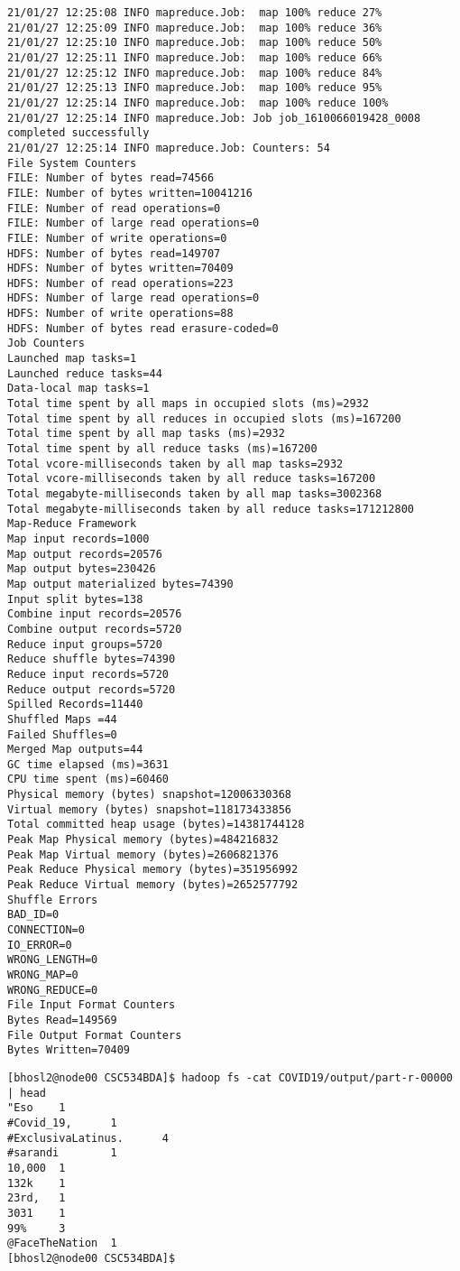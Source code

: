 \documentclass[]{article}
\begin{document}
\begin{verbatim}
21/01/27 12:25:08 INFO mapreduce.Job:  map 100% reduce 27%
21/01/27 12:25:09 INFO mapreduce.Job:  map 100% reduce 36%
21/01/27 12:25:10 INFO mapreduce.Job:  map 100% reduce 50%
21/01/27 12:25:11 INFO mapreduce.Job:  map 100% reduce 66%
21/01/27 12:25:12 INFO mapreduce.Job:  map 100% reduce 84%
21/01/27 12:25:13 INFO mapreduce.Job:  map 100% reduce 95%
21/01/27 12:25:14 INFO mapreduce.Job:  map 100% reduce 100%
21/01/27 12:25:14 INFO mapreduce.Job: Job job_1610066019428_0008 completed successfully
21/01/27 12:25:14 INFO mapreduce.Job: Counters: 54
File System Counters
FILE: Number of bytes read=74566
FILE: Number of bytes written=10041216
FILE: Number of read operations=0
FILE: Number of large read operations=0
FILE: Number of write operations=0
HDFS: Number of bytes read=149707
HDFS: Number of bytes written=70409
HDFS: Number of read operations=223
HDFS: Number of large read operations=0
HDFS: Number of write operations=88
HDFS: Number of bytes read erasure-coded=0
Job Counters
Launched map tasks=1
Launched reduce tasks=44
Data-local map tasks=1
Total time spent by all maps in occupied slots (ms)=2932
Total time spent by all reduces in occupied slots (ms)=167200
Total time spent by all map tasks (ms)=2932
Total time spent by all reduce tasks (ms)=167200
Total vcore-milliseconds taken by all map tasks=2932
Total vcore-milliseconds taken by all reduce tasks=167200
Total megabyte-milliseconds taken by all map tasks=3002368
Total megabyte-milliseconds taken by all reduce tasks=171212800
Map-Reduce Framework
Map input records=1000
Map output records=20576
Map output bytes=230426
Map output materialized bytes=74390
Input split bytes=138
Combine input records=20576
Combine output records=5720
Reduce input groups=5720
Reduce shuffle bytes=74390
Reduce input records=5720
Reduce output records=5720
Spilled Records=11440
Shuffled Maps =44
Failed Shuffles=0
Merged Map outputs=44
GC time elapsed (ms)=3631
CPU time spent (ms)=60460
Physical memory (bytes) snapshot=12006330368
Virtual memory (bytes) snapshot=118173433856
Total committed heap usage (bytes)=14381744128
Peak Map Physical memory (bytes)=484216832
Peak Map Virtual memory (bytes)=2606821376
Peak Reduce Physical memory (bytes)=351956992
Peak Reduce Virtual memory (bytes)=2652577792
Shuffle Errors
BAD_ID=0
CONNECTION=0
IO_ERROR=0
WRONG_LENGTH=0
WRONG_MAP=0
WRONG_REDUCE=0
File Input Format Counters
Bytes Read=149569
File Output Format Counters
Bytes Written=70409
\end{verbatim}

\begin{verbatim}
[bhosl2@node00 CSC534BDA]$ hadoop fs -cat COVID19/output/part-r-00000 | head    
"Eso    1
#Covid_19,      1
#ExclusivaLatinus.      4
#sarandi        1
10,000  1
132k    1
23rd,   1
3031    1
99%     3
@FaceTheNation  1
[bhosl2@node00 CSC534BDA]$
\end{verbatim}
\end{document}
